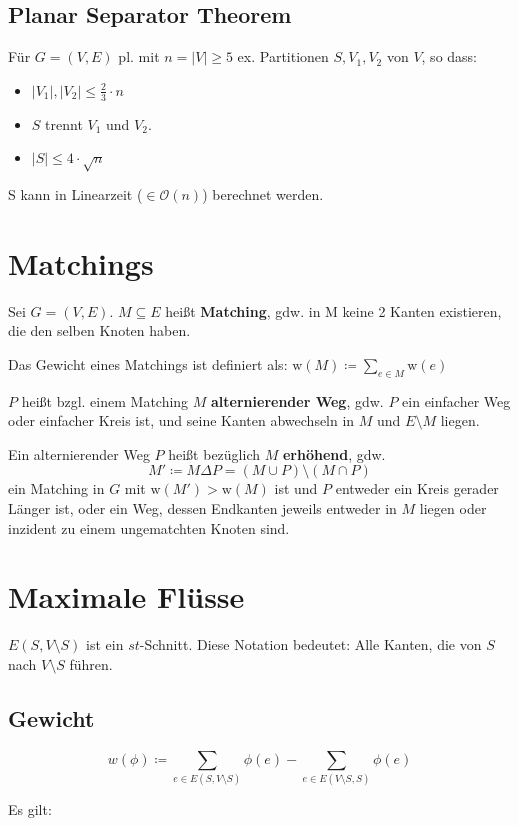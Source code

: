 \documentclass[a4paper,11pt]{report}
\begin{document}
\section{Planar Separator Theorem}
Für $G = (V, E)$ pl. mit $n = |V| \geq 5$ ex. Partitionen $S, V_1, V_2$ von $V$, so dass:
\begin{itemize}
    \item $|V_1|, |V_2| \leq \frac{2}{3} \cdot n$
    \item $S$ trennt $V_1$ und $V_2$.
    \item $|S| \leq 4 \cdot \sqrt{n}$
\end{itemize}

S kann in Linearzeit ($\in \mathcal{O}(n)$) berechnet werden.


\chapter{Matchings}
Sei $G = (V, E)$. $M \subseteq E$ heißt {\bf Matching}, gdw. in M keine 2 Kanten existieren, die den selben Knoten haben.

Das Gewicht eines Matchings ist definiert als: $\text{w}(M) \coloneqq \sum_{e \in M} \text{w}(e)$

$P$ heißt bzgl. einem Matching $M$ \textbf{alternierender Weg}, gdw. $P$ ein einfacher Weg oder einfacher Kreis ist, und seine Kanten abwechseln in $M$ und $E \setminus M$ liegen.

Ein alternierender Weg $P$ heißt bezüglich $M$ \textbf{erhöhend}, gdw.
\[
    M' \coloneqq M \Delta P = (M \cup P) \setminus (M \cap P)
\]
ein Matching in $G$ mit $\text{w}(M') > \text{w}(M)$ ist und $P$ entweder ein Kreis gerader Länger ist, oder ein Weg, dessen Endkanten jeweils entweder in $M$ liegen oder inzident zu einem ungematchten Knoten sind.


\chapter{Maximale Flüsse}
$E(S, V \setminus S)$ ist ein $st$-Schnitt. Diese Notation bedeutet: Alle Kanten, die von $S$ nach $V \setminus S$ führen.


\section{Gewicht}
\[ w(\phi) \coloneqq \sum_{e \in E(S, V \setminus S)} \phi(e) - \sum_{e \in E(V \setminus S, S)} \phi(e) \]

Es gilt:
\end{document}
